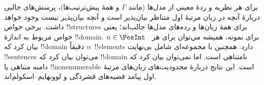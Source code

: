 \documentclass[../../../include/open-logic-section]{subfiles}
\begin{document}
برای هر نظریه و ردهٔ معینی از مدل‌ها (مانند $\Gamma$ و همهٔ
پیش‌ترتیب‌ها)، پرسش‌های جالبی دربارهٔ آنچه در زبان مرتبهٔ اول متناظر
بیان‌پذیر است و آنچه بیان‌پذیر نیست وجود خواهد داشت. برخی خواص
!!{structure}s برای همهٔ زبان‌ها و رده‌های مدل‌ها جالب‌اند؛ یعنی خواص
مربوط به اندازهٔ !!{domain}. برای نمونه، همیشه می‌توان برای هر
~$n \in \PosInt$ بیان کرد که !!{domain} دقیقاً $n$~!!{element}s دارد.
همچنین با مجموعه‌ای شامل بی‌نهایت !!{sentence}s می‌توان بیان کرد که
!!{domain} نامتناهی است. اما نمی‌توان بیان کرد که دامنه متناهی یا
!!{nonenumerable} است. این نتایج دربارهٔ محدودیت‌های زبان‌های مرتبهٔ
اول پیامد قضیه‌های فشردگی و لوونهایم--اسکولم‌اند.
\end{document}
